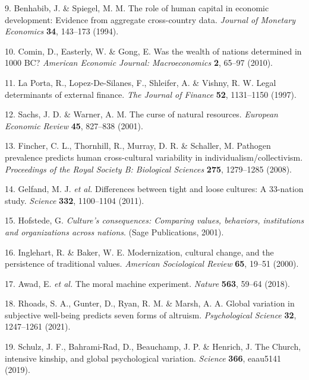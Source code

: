 \documentclass[english,man,floatsintext]{apa6}
\begin{document}
\leavevmode\hypertarget{ref-Benhabib1994}{}%
9. Benhabib, J. \& Spiegel, M. M. The role of human capital in economic development: Evidence from aggregate cross-country data. \emph{Journal of Monetary Economics} \textbf{34}, 143--173 (1994).

\leavevmode\hypertarget{ref-Comin2010}{}%
10. Comin, D., Easterly, W. \& Gong, E. Was the wealth of nations determined in 1000 BC? \emph{American Economic Journal: Macroeconomics} \textbf{2}, 65--97 (2010).

\leavevmode\hypertarget{ref-LaPorta1997}{}%
11. La Porta, R., Lopez-De-Silanes, F., Shleifer, A. \& Vishny, R. W. Legal determinants of external finance. \emph{The Journal of Finance} \textbf{52}, 1131--1150 (1997).

\leavevmode\hypertarget{ref-Sachs2001}{}%
12. Sachs, J. D. \& Warner, A. M. The curse of natural resources. \emph{European Economic Review} \textbf{45}, 827--838 (2001).

\leavevmode\hypertarget{ref-Fincher2008}{}%
13. Fincher, C. L., Thornhill, R., Murray, D. R. \& Schaller, M. Pathogen prevalence predicts human cross-cultural variability in individualism/collectivism. \emph{Proceedings of the Royal Society B: Biological Sciences} \textbf{275}, 1279--1285 (2008).

\leavevmode\hypertarget{ref-Gelfand2011}{}%
14. Gelfand, M. J. \emph{et al.} Differences between tight and loose cultures: A 33-nation study. \emph{Science} \textbf{332}, 1100--1104 (2011).

\leavevmode\hypertarget{ref-Hofstede2001}{}%
15. Hofstede, G. \emph{Culture's consequences: Comparing values, behaviors, institutions and organizations across nations}. (Sage Publications, 2001).

\leavevmode\hypertarget{ref-Inglehart2000}{}%
16. Inglehart, R. \& Baker, W. E. Modernization, cultural change, and the persistence of traditional values. \emph{American Sociological Review} \textbf{65}, 19--51 (2000).

\leavevmode\hypertarget{ref-Awad2018}{}%
17. Awad, E. \emph{et al.} The moral machine experiment. \emph{Nature} \textbf{563}, 59--64 (2018).

\leavevmode\hypertarget{ref-Rhoads2021}{}%
18. Rhoads, S. A., Gunter, D., Ryan, R. M. \& Marsh, A. A. Global variation in subjective well-being predicts seven forms of altruism. \emph{Psychological Science} \textbf{32}, 1247--1261 (2021).

\leavevmode\hypertarget{ref-Schulz2019}{}%
19. Schulz, J. F., Bahrami-Rad, D., Beauchamp, J. P. \& Henrich, J. The Church, intensive kinship, and global psychological variation. \emph{Science} \textbf{366}, eaau5141 (2019).
\end{document}
